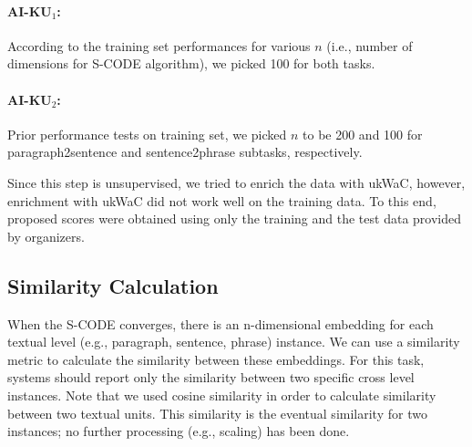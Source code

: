 \documentclass[11pt]{article}
\begin{document}
\paragraph{AI-KU$_1$:} According to the training set performances for various $n$ (i.e., number of dimensions for S-CODE algorithm), we picked 100 for both tasks.


\begin{table}[hl]
\begin{center}
\end{center}
\caption{\label{table:results-p2s-train} Paragraph-2-Sentence subtask scores for the training data. Subscripts in AI-KU systems specify the run number.}
\end{table}

\paragraph{AI-KU$_2$:} Prior performance tests on training set, we picked $n$ to be 200 and 100 for paragraph2sentence and sentence2phrase subtasks, respectively.


Since this step is unsupervised, we tried to enrich the data with ukWaC, however, enrichment with ukWaC did not work well on the training data. To this end, proposed scores were obtained using only the training and the test data provided by organizers.

\subsection{Similarity Calculation}

When the S-CODE converges, there is an n-dimensional embedding for each textual level (e.g., paragraph, sentence, phrase) instance. We can use a similarity metric to calculate 
the similarity between these embeddings. For this task, systems should report only the similarity between two specific cross level instances. Note that we used cosine similarity in order to calculate similarity between two textual units. This similarity is the eventual similarity for two instances; no further processing (e.g., scaling) has been done.
\end{document}
